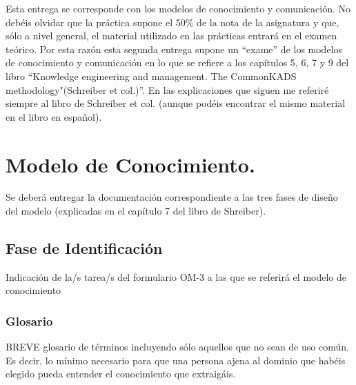 \documentclass[12pt,a4paper,twoside,spanish]{article}      %
\begin{document}
\setlength{\parindent}{1,5cm} \setlength{\parskip}{0,7cm}


Esta entrega se corresponde con los modelos de conocimiento y
comunicación.  No debéis olvidar que la práctica supone el 50\% de la nota de la asignatura
y que, sólo a nivel general, el material utilizado en las prácticas entrará en
el examen teórico. Por esta razón esta segunda entrega supone un
``exame'' de los modelos de conocimiento y comunicación en lo que se
refiere a los capítulos 5, 6, 7 y 9 del libro ``Knowledge engineering and
management. The CommonKADS methodology"(Schreiber et col.)''. En las
explicaciones que siguen me referiré siempre al libro de Schreiber et col.
(aunque podéis encontrar el mismo material en el libro en español).


\section{Modelo de Conocimiento.}

Se deberá entregar la documentación correspondiente a las tres fases
de diseño del modelo (explicadas en el capítulo 7 del libro de Shreiber).

\subsection{Fase de Identificación}

Indicación de la/s tarea/s del formulario OM-3 a las que se
referirá el modelo de conocimiento

\subsubsection{Glosario}

BREVE glosario de términos incluyendo sólo aquellos que no sean
de uso común. Es decir, lo mínimo necesario para que una persona ajena al
dominio que habéis elegido pueda entender el conocimiento que extraigáis.
\end{document}
